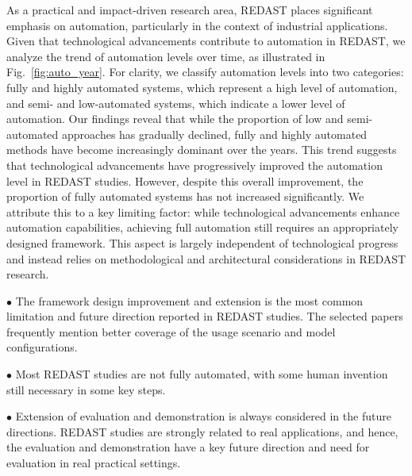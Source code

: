 As a practical and impact-driven research area, REDAST places significant emphasis on automation, particularly in the context of industrial applications. Given that technological advancements contribute to automation in REDAST, we analyze the trend of automation levels over time, as illustrated in Fig.~\ref{fig:auto_year}. For clarity, we classify automation levels into two categories: fully and highly automated systems, which represent a high level of automation, and semi- and low-automated systems, which indicate a lower level of automation. Our findings reveal that while the proportion of low and semi-automated approaches has gradually declined, fully and highly automated methods have become increasingly dominant over the years. This trend suggests that technological advancements have progressively improved the automation level in REDAST studies. However, despite this overall improvement, the proportion of fully automated systems has not increased significantly. We attribute this to a key limiting factor: while technological advancements enhance automation capabilities, achieving full automation still requires an appropriately designed framework. This aspect is largely independent of technological progress and instead relies on methodological and architectural considerations in REDAST research.


\begin{tcolorbox}[mybox, breakable, title=RQ5 Key Takeaways]

$\bullet$ The framework design improvement and extension is the most common limitation and future direction reported in REDAST studies. The selected papers frequently mention better coverage of the usage scenario and model configurations.

$\bullet$ Most REDAST studies are not fully automated, with some human invention still necessary in some key steps.

$\bullet$ Extension of evaluation and demonstration is always considered in the future directions. REDAST studies are strongly related to real applications, and hence, the evaluation and demonstration have a key future direction and need for evaluation in real practical settings.

\end{tcolorbox}